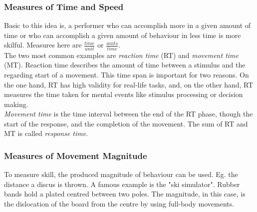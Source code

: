 \subsubsection{Measures of Time and Speed}
\label{section:timeandspeed}
Basic to this idea is, a performer who can accomplish more in a given amount of time or who can accomplish a given amount of behaviour in less time is more skilful. Measures here are
$\frac{time}{unit}$ or $\frac{units}{time}$.\\
The two most common examples are \textit{reaction time} (RT) and \textit{movement time} (MT). Reaction time describes the amount of time between a stimulus and the regarding start of a movement. This time span is important for two reasons. On the one hand, RT has high validity for real-life tasks, and, on the other hand, RT measures the time taken for mental events like stimulus processing or decision making.\\
\textit{Movement time} is the time interval between the end of the RT phase, though the start of the response, and the completion of the movement. The sum of RT and MT is called \textit{response time}.

\subsubsection{Measures of Movement Magnitude}
To measure skill, the produced magnitude of behaviour can be used. Eg. the distance a discus is thrown. A famous example is the "ski simulator". Rubber bands hold a plated centred between two poles. The magnitude, in this case, is the dislocation of the board from the centre by using full-body movements.

